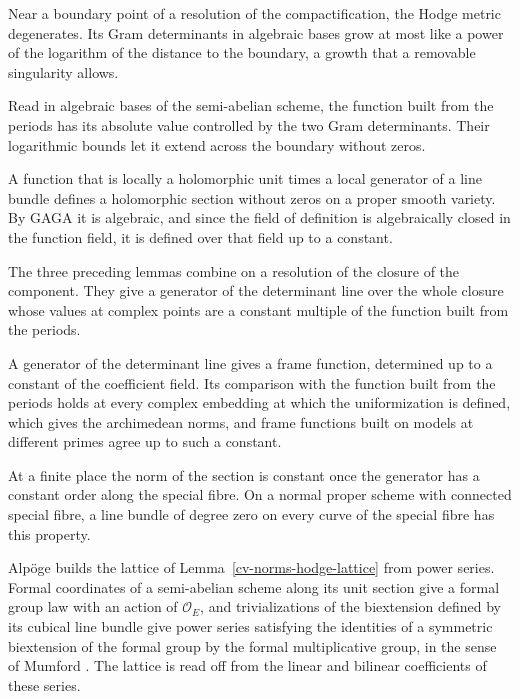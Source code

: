 Near a boundary point of a resolution of the compactification, the Hodge metric degenerates. Its Gram
determinants in algebraic bases grow at most like a power of the logarithm of the distance to the
boundary, a growth that a removable singularity allows.

Read in algebraic bases of the semi-abelian scheme, the function built from the periods has its
absolute value controlled by the two Gram determinants. Their logarithmic bounds let it extend
across the boundary without zeros.

A function that is locally a holomorphic unit times a local generator of a line bundle defines a
holomorphic section without zeros on a proper smooth variety. By GAGA it is algebraic, and since the
field of definition is algebraically closed in the function field, it is defined over that field up
to a constant.

The three preceding lemmas combine on a resolution of the closure of the component. They give a
generator of the determinant line over the whole closure whose values at complex points are a
constant multiple of the function built from the periods.

A generator of the determinant line gives a frame function, determined up to a constant of the
coefficient field. Its comparison with the function built from the periods holds at every complex
embedding at which the uniformization is defined, which gives the archimedean norms, and frame
functions built on models at different primes agree up to such a constant.

At a finite place the norm of the section is constant once the generator has a constant order along
the special fibre. On a normal proper scheme with connected special fibre, a line bundle of degree
zero on every curve of the special fibre has this property.

Alpöge builds the lattice of Lemma~\ref{cv-norms-hodge-lattice} from power series. Formal coordinates
of a semi-abelian scheme along its unit section give a formal group law with an action of
$\mathcal O_E$, and trivializations of the biextension defined by its cubical line bundle give power
series satisfying the identities of a symmetric biextension of the formal group by the formal
multiplicative group, in the sense of Mumford \cite{Mum69}. The lattice is read off from the linear
and bilinear coefficients of these series.

